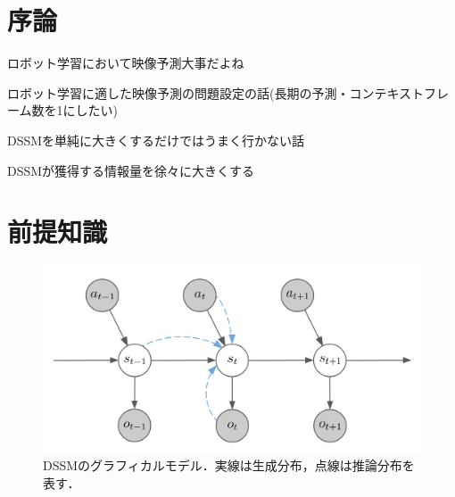 \documentclass[10pt, twocolumn]{jarticle}
\begin{document}
%


\section{序論}
ロボット学習において映像予測大事だよね

ロボット学習に適した映像予測の問題設定の話(長期の予測・コンテキストフレーム数を1にしたい)

DSSMを単純に大きくするだけではうまく行かない話

DSSMが獲得する情報量を徐々に大きくする

\section{前提知識}

\begin{figure}[bp]
    \begin{center}
      \includegraphics[width=0.9\linewidth]{./figures/dssm.png}
      \caption[DSSMのグラフィカルモデル]{DSSMのグラフィカルモデル．実線は生成分布，点線は推論分布を表す．}
      \label{fig:ssm}
    \end{center}
  \end{figure}
\end{document}

